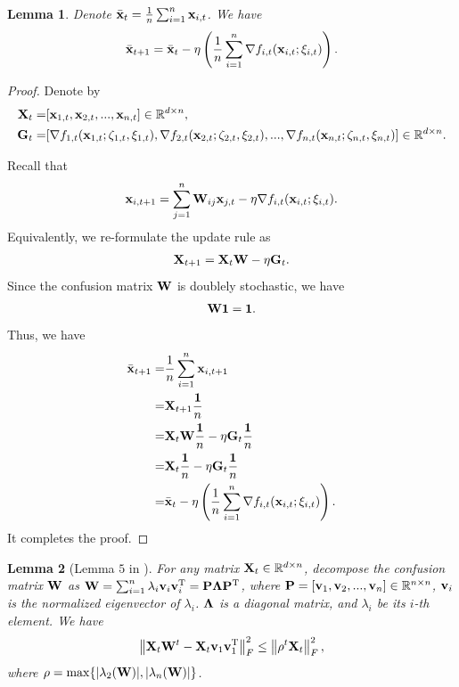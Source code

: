\documentclass{article}
\newtheorem{Lemma}{\bf{Lemma}}
\begin{document}
\begin{Lemma}
\label{lemma_average_update_rule}
Denote $\bar{{\bf x}}_t = \frac{1}{n}\sum_{i=1}^n {\bf x}_{i,t}$. We have
\begin{align}
\nonumber
\bar{{\bf x}}_{t+1} =  \bar{{\bf x}}_{t} - \eta \left( \frac{1}{n} \sum_{i=1}^n \nabla f_{i,t}({\bf x}_{i,t};\xi_{i,t}) \right). 
\end{align}
\end{Lemma}
\begin{proof}
Denote by
\begin{align}
\nonumber
{\bf X}_t = &  [{\bf x}_{1,t}, {\bf x}_{2,t}, ..., {\bf x}_{n,t}] \in \mathbb{R}^{d\times n}, \\ \nonumber
{\bf G}_t = & [\nabla f_{1,t}({\bf x}_{1,t};\zeta_{1,t},\xi_{1,t}), \nabla f_{2,t}({\bf x}_{2,t};\zeta_{2,t},\xi_{2,t}), ..., \nabla f_{n,t}({\bf x}_{n,t};\zeta_{n,t},\xi_{n,t})] \in \mathbb{R}^{d\times n}.
\end{align}

Recall that 
\begin{align}
\nonumber
{\bf x}_{i,t+1} = \sum_{j=1}^n {\bf W}_{ij}{\bf x}_{j,t} - \eta \nabla f_{i,t}({\bf x}_{i,t};\xi_{i,t}).
\end{align} Equivalently, we re-formulate the update rule as
\begin{align}
\nonumber
{\bf X}_{t+1} = {\bf X}_{t}{\bf W} - \eta {\bf G}_t.
\end{align} Since the confusion matrix ${\bf W}$ is doublely stochastic, we have
\begin{align}
\nonumber
{\bf W} {\bf 1} = {\bf 1}.
\end{align} Thus, we have
\begin{align}
\nonumber
\bar{{\bf x}}_{t+1} = & \frac{1}{n}\sum_{i=1}^n {\bf x}_{i,t+1} \\ \nonumber
= & {\bf X}_{t+1}\frac{{\bf 1}}{n} \\ \nonumber 
= & {\bf X}_{t}{\bf W}\frac{{\bf 1}}{n} - \eta {\bf G}_t\frac{{\bf 1}}{n} \\ \nonumber
= & {\bf X}_{t}\frac{{\bf 1}}{n} - \eta {\bf G}_t\frac{{\bf 1}}{n} \\ \nonumber
=& \bar{{\bf x}}_{t} - \eta \left( \frac{1}{n} \sum_{i=1}^n \nabla f_{i,t}({\bf x}_{i,t};\xi_{i,t}) \right). 
\end{align} It completes the proof.
\end{proof}

\begin{Lemma}[Lemma $5$ in \citep{Tang:2018un}]
\label{lemma_hanlin_1}
For any matrix ${\bf X}_t\in\mathbb{R}^{d\times n}$, decompose the confusion matrix ${\bf W}$ as ${\bf W} = \sum_{i=1}^n \lambda_i {\bf v}_i {\bf v}_i^{\rm T} = {\bf P} \mathbf{\Lambda} {\bf P}^{\rm T}$, where ${\bf P} = [{\bf v}_1, {\bf v}_2, ..., {\bf v}_n]\in\mathbb{R}^{n\times n}$, ${\bf v}_i$ is the normalized eigenvector of $\lambda_i$. $\mathbf{\Lambda}$ is a diagonal matrix, and $\lambda_i$ be its $i$-th element. We have
\begin{align}
\nonumber
\left\lVert{\bf X}_t {\bf W}^t - {\bf X}_t {\bf v}_1 {\bf v}_1^{\rm T} \right\rVert_F^2 \le \left\lVert\rho^t {\bf X}_t\right\rVert_F^2, 
\end{align} where  $\rho = \max \{| \lambda_2({\bf W}) |, | \lambda_n({\bf W}) |\}$. 

\end{Lemma}
\end{document}
